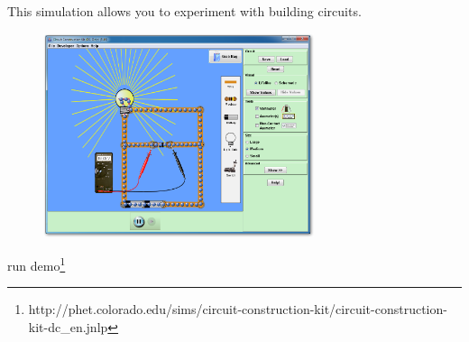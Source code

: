     \addtocounter{footnote}{-0}
    
          \par 

\label{m38771*fs-id5490818}This simulation allows you to experiment with building circuits.

    \setcounter{subfigure}{0}


	\begin{figure}[H] %
    \begin{center}
    \label{m38771*id6345821!!!underscore!!!media}\label{m38771*id6345821!!!underscore!!!printimage}\includegraphics{col11305.imgs/m38771_circuit-kit.png} %
        
      \vspace{2pt}
    \vspace{.1in}
    
    \end{center}

 \end{figure}   

    \addtocounter{footnote}{-0}
    

run demo\footnote{http://phet.colorado.edu/sims/circuit-construction-kit/circuit-construction-kit-dc\_en.jnlp}
        \par 

\par
            \label{m38771*secfhsst!!!underscore!!!id298}\vspace{.5cm} 
      
